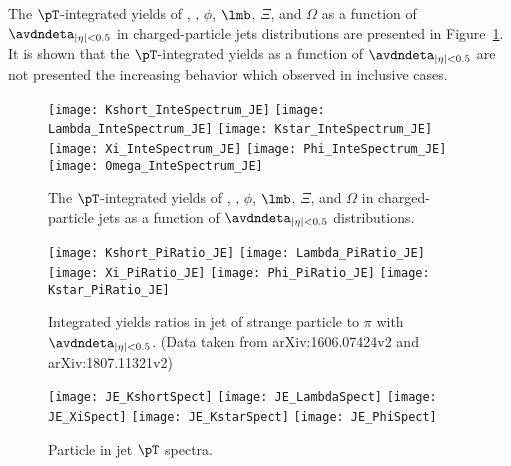 \documentclass[ALICE,manyauthors]{StrinJet}
\begin{document}
The $\pT$-integrated yields of \kzero, \kstar, $\phi$, $\lmb$, $\Xi$, and $\Omega$ as a function of $\avdndeta_{|\eta| < 0.5}$ in charged-particle jets distributions are presented in Figure~\ref{fig:JCIntePar}. It is shown that the $\pT$-integrated yields as a function of $\avdndeta_{|\eta| < 0.5}$ are not presented the increasing behavior which observed in inclusive cases.
\begin{figure}[ht]
	\begin{center}
		\texttt{[image: Kshort\_InteSpectrum\_JE]}
		\texttt{[image: Lambda\_InteSpectrum\_JE]}
		\texttt{[image: Kstar\_InteSpectrum\_JE]}
		\texttt{[image: Xi\_InteSpectrum\_JE]}
		\texttt{[image: Phi\_InteSpectrum\_JE]}
		\texttt{[image: Omega\_InteSpectrum\_JE]}
	\end{center}
	\caption{The $\pT$-integrated yields of \kzero, \kstar, $\phi$, $\lmb$, $\Xi$, and $\Omega$ in charged-particle jets as a function of $\avdndeta_{|\eta|<0.5}$ distributions.}
	\label{fig:JCIntePar}
\end{figure}

\begin{figure}[ht]
	\begin{center}
		\texttt{[image: Kshort\_PiRatio\_JE]}
		\texttt{[image: Lambda\_PiRatio\_JE]}
		\texttt{[image: Xi\_PiRatio\_JE]}
		\texttt{[image: Phi\_PiRatio\_JE]}
		\texttt{[image: Kstar\_PiRatio\_JE]}
	\end{center}
	\caption{Integrated yields ratios in jet of strange particle to $\pi$ with $\avdndeta_{|\eta|<0.5}$. (Data taken from arXiv:1606.07424v2 and arXiv:1807.11321v2)}
	\label{fig:JEIntePartoPiRatio}
\end{figure}


\begin{figure}[ht]
	\begin{center}
		\texttt{[image: JE\_KshortSpect]}
		\texttt{[image: JE\_LambdaSpect]}
		\texttt{[image: JE\_XiSpect]}
		\texttt{[image: JE\_KstarSpect]}
		\texttt{[image: JE\_PhiSpect]}
	\end{center}
	\caption{Particle in jet $\pT$ spectra.}
	\label{fig:JEParSpect}
\end{figure}
\end{document}
